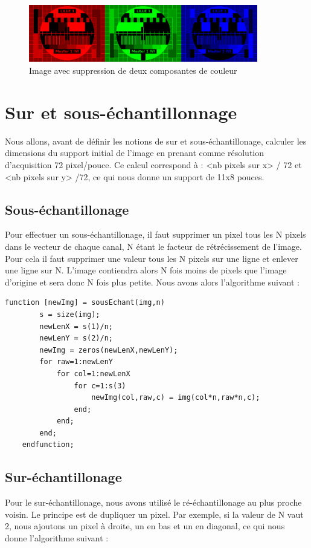 \documentclass[a4paper,11pt]{article}
\begin{document}
  \begin{figure}[H]
    \center
    \includegraphics[width=10cm]{../mire_couleur.png}
    \caption{Image avec suppression de deux composantes de couleur}
  \end{figure}
  
  \section{Sur et sous-échantillonnage}
  Nous allons, avant de définir les notions de sur et sous-échantillonage, calculer les dimensions du support
  initial de l'image en prenant comme résolution d'acquisition 72 pixel/pouce. Ce calcul correspond à :
  <nb pixels sur x> / 72 et <nb pixels sur y> /72, ce qui nous donne un support de 11x8 pouces.
  
  \subsection{Sous-échantillonage}
  Pour effectuer un sous-échantillonage, il faut supprimer un pixel tous les N pixels dans le vecteur de chaque canal,
  N étant le facteur de rétrécissement de l'image.
  Pour cela il faut supprimer une valeur tous les N pixels sur une ligne et enlever une ligne sur N. L'image contiendra
  alors N fois moins de pixels que l'image d'origine et sera donc N fois plus petite. Nous avons alors l'algorithme suivant :\\

  \begin{lstlisting}[caption=Fonction permettant le sous-échantillonnement d'une image]
    function [newImg] = sousEchant(img,n)
        s = size(img);
        newLenX = s(1)/n;
        newLenY = s(2)/n;
        newImg = zeros(newLenX,newLenY);
        for raw=1:newLenY
            for col=1:newLenX
                for c=1:s(3)
                    newImg(col,raw,c) = img(col*n,raw*n,c);
                end;
            end;
        end;
    endfunction;
  \end{lstlisting}
  
  \subsection{Sur-échantillonage}
  Pour le sur-échantillonage, nous avons utilisé le ré-échantillonage au plus proche voisin. Le principe
  est de dupliquer un pixel. Par exemple, si la valeur de N vaut 2, nous ajoutons un pixel à droite, un en bas et un en diagonal,
  ce qui nous donne l'algorithme suivant :\\
  
\end{document}
